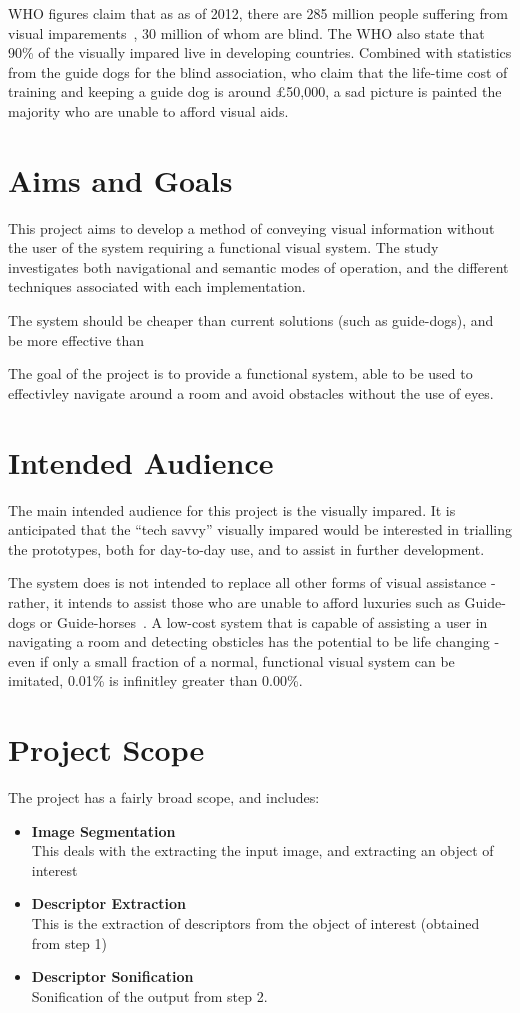 \ac{WHO} figures claim that as as of 2012, there are 285 million people suffering from visual imparements~\cite{whoblindness}, 30 million of whom are blind. The \ac{WHO} also state that 90\% of the visually impared live in developing countries. Combined with statistics from the guide dogs for the blind association, who claim that the life-time cost of training and keeping a guide dog is around £50,000, a sad picture is painted the majority who are unable to afford visual aids.

\section{Aims and Goals}
This project aims to develop a method of conveying visual information without the user of the system requiring a functional visual system. The study investigates both navigational and semantic modes of operation, and the different techniques associated with each implementation.

The system should be cheaper than current solutions (such as guide-dogs), and be more effective than 

The goal of the project is to provide a functional system, able to be used to effectivley navigate around a room and avoid obstacles without the use of eyes.  

\section{Intended Audience}
The main intended audience for this project is the visually impared. It is anticipated that the ``tech savvy'' visually impared would be interested in trialling the prototypes, both for day-to-day use, and to assist in further development.

The system does is not intended to replace all other forms of visual assistance - rather, it intends to assist those who are unable to afford luxuries such as Guide-dogs or Guide-horses~\cite{guidehorse}. A low-cost system that is capable of assisting a user in navigating a room and detecting obsticles has the potential to be life changing - even if only a small fraction of a normal, functional visual system can be imitated, 0.01\% is infinitley greater than 0.00\%.

\section{Project Scope}
The project has a fairly broad scope, and includes:
\begin{itemize}
    \item \textbf{Image Segmentation} \hfill \\
        This deals with the extracting the input image, and extracting an object of interest
    \item \textbf{Descriptor Extraction} \hfill \\
        This is the extraction of descriptors from the object of interest (obtained from step 1)
    \item \textbf{Descriptor Sonification} \hfill \\
        Sonification of the output from step 2.
\end{itemize}

